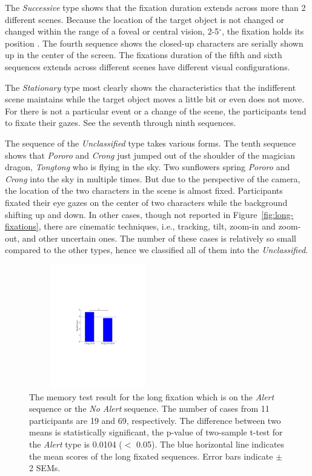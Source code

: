 \documentclass[10pt,letterpaper]{article}
\begin{document}
The \textit{Successive} type shows that the fixation duration extends across more than 2 different scenes. Because the location of the target object is not changed or changed within the range of a foveal or central vision, 2-5$^{\circ}$, the fixation holds its position \cite{mcmorris2014acquisition}. The fourth sequence shows the closed-up characters are serially shown up in the center of the screen. The fixations duration of the fifth and sixth sequences extends across different scenes have different visual configurations.

The \textit{Stationary} type most clearly shows the characteristics that the indifferent scene maintains while the target object moves a little bit or even does not move. For there is not a particular event or a change of the scene, the participants tend to fixate their gazes. See the seventh through ninth sequences.

The sequence of the \textit{Unclassified} type takes various forms. The tenth sequence shows that \textit{Pororo} and \textit{Crong} just jumped out of the shoulder of the magician dragon, \textit{Tongtong} who is flying in the sky. Two sunflowers spring \textit{Pororo} and \textit{Crong} into the sky in multiple times. But due to the perspective of the camera, the location of the two characters in the scene is almost fixed. Participants fixated their eye gazes on the center of two characters while the background shifting up and down. In other cases, though not reported in Figure~\ref{fig:long-fixations}, there are cinematic techniques, i.e., tracking, tilt, zoom-in and zoom-out, and other uncertain ones. The number of these cases is relatively so small compared to the other types, hence we classified all of them into the \textit{Unclassified}.

\begin{figure}
  \centerline{\includegraphics[width=60mm,height=54mm,trim=65mm 103mm 68mm 100mm]{./eps/memtest_long.pdf}}
  \caption{The memory test result for the long fixation which is on the \textit{Alert} sequence or the \textit{No Alert} sequence. The number of cases from 11 participants are 19 and 69, respectively. The difference between two means is statistically significant, the p-value of two-sample t-test for the \textit{Alert} type is 0.0104 ($<$ 0.05). The blue horizontal line indicates the mean scores of the long fixated sequences. Error bars indicate $\pm$ 2 SEMs.}
  \label{fig:memtest-long}
\end{figure}
\end{document}
